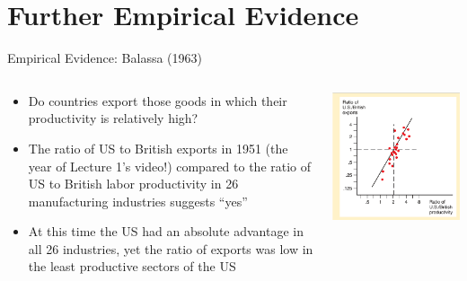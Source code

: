 \documentclass[10pt,hyperref={CJKbookmarks=true},xcolor=dvipsnames,aspectratio=169]{beamer}
\begin{document}
\section{Further Empirical Evidence}
\begin{frame}{Empirical Evidence: Balassa (1963) }


\begin{columns}[onlytextwidth]
\begin{column}{0.6\textwidth}
\begin{itemize}
\item Do countries export those goods in which their productivity is relatively
high? 
\item The ratio of US to British exports in 1951 (the year of Lecture 1’s
video!) compared to the ratio of US to British labor productivity
in 26 manufacturing industries suggests “yes” 
\item At this time the US had an absolute advantage in all 26 industries,
yet the ratio of exports was low in the least productive sectors of
the US 
\end{itemize}

\end{column}
\begin{column}{0.4\textwidth}
\includegraphics[width=\columnwidth]{fig/ricardo/lec3-22}
\end{column}
\end{columns}

\end{frame}
\end{document}
